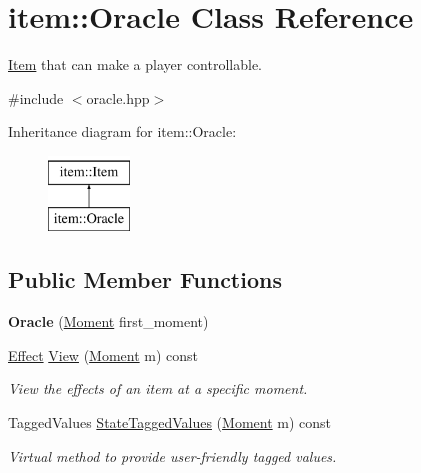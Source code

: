 \hypertarget{classitem_1_1_oracle}{}\section{item\+:\+:Oracle Class Reference}
\label{classitem_1_1_oracle}


\hyperlink{classitem_1_1_item}{Item} that can make a player controllable.  




{\ttfamily \#include $<$oracle.\+hpp$>$}

Inheritance diagram for item\+:\+:Oracle\+:\begin{figure}[H]
\begin{center}
\leavevmode
\includegraphics[height=2.000000cm]{classitem_1_1_oracle}
\end{center}
\end{figure}
\subsection*{Public Member Functions}
\begin{DoxyCompactItemize}
\item 
\mbox{\label{classitem_1_1_oracle_aef8394c1370b0cf661b84ea454cff536}} 
{\bfseries Oracle} (\hyperlink{classtimeplane_1_1_moment}{Moment} first\+\_\+moment)
\item 
\hyperlink{classitem_1_1_effect}{Effect} \hyperlink{classitem_1_1_oracle_ade8c5db0ab73bfa61d5dbe2c9c405f5c}{View} (\hyperlink{classtimeplane_1_1_moment}{Moment} m) const
\begin{DoxyCompactList}\small\item\em View the effects of an item at a specific moment. \end{DoxyCompactList}\item 
Tagged\+Values \hyperlink{classitem_1_1_oracle_a78dd3984a5a0dae432c86e18520d7c46}{State\+Tagged\+Values} (\hyperlink{classtimeplane_1_1_moment}{Moment} m) const
\begin{DoxyCompactList}\small\item\em Virtual method to provide user-\/friendly tagged values. \end{DoxyCompactList}\end{DoxyCompactItemize}
